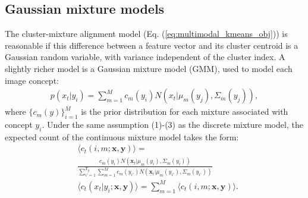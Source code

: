 \documentclass[journal]{IEEEtran}
\begin{document}
\subsection{Gaussian mixture models}
The cluster-mixture alignment model (Eq. (\ref{eq:multimodal_kmeans_obj})) is reasonable if this difference between a feature vector and its cluster centroid is a Gaussian random variable, with variance independent of the cluster index. A slightly richer model is a Gaussian mixture model (GMM), used to model each image concept:
\begin{align}\label{eq:gmm_prob}
    p(x_t|y_i) = \sum_{m=1}^{M} c_m(y_i) N( x_t|\mu_m(y_j), \Sigma_m(y_j)),
\end{align}
where $\{c_m(y)\}_{i=1}^M$ is the prior distribution for each mixture associated with concept $y_i$. Under the same assumption (1)-(3) as the discrete mixture model, the expected count of the continuous mixture model takes the form:
\begin{align}\label{eq:expected_count_gmm}
    &\langle c_t(i, m;\mathbf x, \mathbf y) \rangle =\nonumber\\ &\frac{c_{m}(y_{i})N(\mathbf x_t|\mu_{m}(y_{i}), \Sigma_{m}(y_{i}))}{\sum_{i'=1}^{T_y} \sum_{m=1}^M c_m(y_{i'})N(\mathbf x_t|\mu_m(y_{i'}), \Sigma_m(y_{i'}))} \\
    &\langle c_t(x_t|y_{i}; \mathbf x, \mathbf y) \rangle = \sum_{m=1}^M \langle c_t(i, m; \mathbf x, \mathbf y) \rangle.
\end{align}
\end{document}
